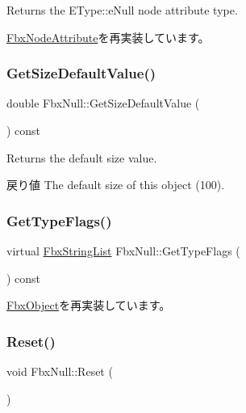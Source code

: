 Returns the E\+Type\+::e\+Null node attribute type. 



\hyperlink{class_fbx_node_attribute_a1c2116756906127145a2b8721fc26752}{Fbx\+Node\+Attribute}を再実装しています。

\mbox{\label{class_fbx_null_a2d6dbed70d91457c2d7c50007b8f148e}} 
\subsubsection{\texorpdfstring{Get\+Size\+Default\+Value()}{GetSizeDefaultValue()}}
{\footnotesize\ttfamily double Fbx\+Null\+::\+Get\+Size\+Default\+Value (\begin{DoxyParamCaption}{ }\end{DoxyParamCaption}) const}

Returns the default size value. \begin{DoxyReturn}{戻り値}
The default size of this object (100). 
\end{DoxyReturn}
\mbox{\label{class_fbx_null_a48d35f4f24364e439f0d8a8e07c6d98f}} 
\subsubsection{\texorpdfstring{Get\+Type\+Flags()}{GetTypeFlags()}}
{\footnotesize\ttfamily virtual \hyperlink{class_fbx_string_list}{Fbx\+String\+List} Fbx\+Null\+::\+Get\+Type\+Flags (\begin{DoxyParamCaption}{ }\end{DoxyParamCaption}) const\hspace{0.3cm}{\ttfamily [virtual]}}



\hyperlink{class_fbx_object_a6d30a5d00400039a248977cf9f9255b2}{Fbx\+Object}を再実装しています。

\mbox{\label{class_fbx_null_add3bbcdc43864c3e8341c31e1cc68ec9}} 
\subsubsection{\texorpdfstring{Reset()}{Reset()}}
{\footnotesize\ttfamily void Fbx\+Null\+::\+Reset (\begin{DoxyParamCaption}{ }\end{DoxyParamCaption})}



